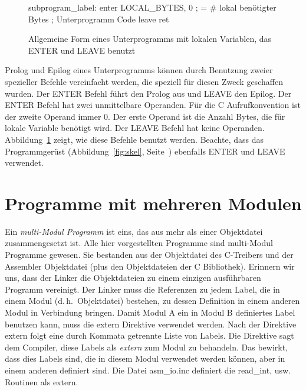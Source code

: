 \begin{figure}[ht]
\begin{AsmCodeListing}[frame=single, numbers=left, commandchars=\\\{\}]
 subprogram_label:
      enter  LOCAL_BYTES, 0   ; = # lokal ben\"{o}tigter Bytes
 ; Unterprogramm Code
      leave
      ret
\end{AsmCodeListing}
\caption{Allgemeine Form eines Unterprogramms mit lokalen Variablen,
das {\code ENTER} und {\code LEAVE} benutzt \label{fig:subskel3}}
\end{figure}

 Prolog und Epilog eines Unterprogramms
k\"{o}nnen durch Benutzung zweier spezieller Befehle vereinfacht werden,
die speziell f\"{u}r diesen Zweck geschaffen wurden. Der {\code ENTER}
 Befehl f\"{u}hrt den Prolog aus und {\code
LEAVE}  den Epilog. Der {\code ENTER}
Befehl hat zwei unmittelbare Operanden. F\"{u}r die C Aufrufkonvention
ist der zweite Operand immer 0. Der erste Operand ist die Anzahl
Bytes, die f\"{u}r lokale Variable ben\"{o}tigt wird. Der {\code LEAVE}
Befehl hat keine Operanden. Abbildung~\ref{fig:subskel3} zeigt, wie
diese Befehle benutzt werden. Beachte, dass das Programmger\"{u}st
(Abbildung~\ref{fig:skel}, Seite~\pageref{fig:skel}) ebenfalls
{\code ENTER} und {\code LEAVE} verwendet.   

\section{Programme mit mehreren Modulen}

Ein \emph{multi-Modul Programm} ist eins, das aus mehr als einer
Objektdatei zusammengesetzt ist. Alle hier vorgestellten Programme
sind multi-Modul Programme gewesen. Sie bestanden aus der
Objektdatei des C-Treibers und der Assembler Objektdatei (plus den
Objektdateien der C Bibliothek). Erinnern wir uns, dass der Linker
die Objektdateien zu einem einzigen ausf\"{u}hrbaren Programm vereinigt.
Der Linker muss die Referenzen zu jedem Label, die in einem Modul
(d.\,h.\ Objektdatei) bestehen, zu dessen Definition in einem
anderen Modul in Verbindung bringen. Damit Modul A ein in Modul B
definiertes Label benutzen kann, muss die {\code extern} Direktive
verwendet werden. Nach der Direktive {\code extern}
 folgt eine durch Kommata getrennte Liste
von Labels. Die Direktive sagt dem Compiler, diese Labels als
\emph{extern} zum Modul zu behandeln. Das bewirkt, dass dies Labels
sind, die in diesem Modul verwendet werden k\"{o}nnen, aber in einem
anderen definiert sind. Die Datei {\code asm\_io.inc} definiert die
{\code read\_int}, usw\@. Routinen als extern.


